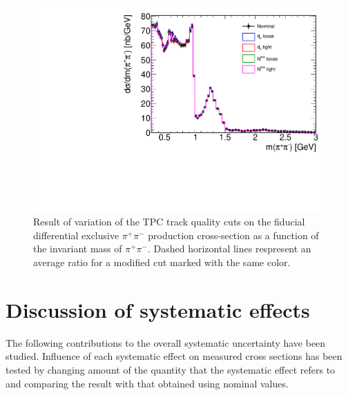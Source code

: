 \begin{figure}[h]
\centering
\includegraphics[width=.8\textwidth,page=2]{graphics/systematics/TrackQualityCutVariation_InvMass.pdf}
%
\caption[Result of variation of the TPC track quality cuts on $d\sigma/dm(\pi^{+}\pi^{-})$.]{Result of variation of the TPC track quality cuts on the fiducial differential exclusive $\pi^{+}\pi^{-}$ production cross-section as a function of the invariant mass of $\pi^{+}\pi^{-}$. Dashed horizontal lines respresent an average ratio for a modified cut marked with the same color.}
\label{fig:tpcQuaVariation}
\end{figure}



\section{Discussion of systematic effects}\label{sec:systEffectsList}
The following contributions to the overall systematic uncertainty have been studied. Influence of each systematic effect on measured cross sections has been tested by changing amount of the quantity that the systematic effect refers to and comparing the result with that obtained using nominal values.

